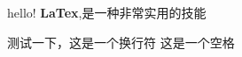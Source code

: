 \documentclass[UTF-8]{ctexart}
\begin{document}
hello!	
\textbf{LaTex},是一种非常实用的技能


测试一下，这是一个换行符
这是一个空格
\end{document}

